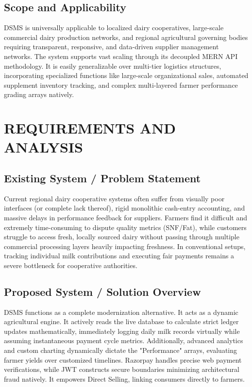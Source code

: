 \documentclass[12pt,a4paper]{report}
\begin{document}
\section{Scope and Applicability}
DSMS is universally applicable to localized dairy cooperatives, large-scale commercial dairy production networks, and regional agricultural governing bodies requiring transparent, responsive, and data-driven supplier management networks. The system supports vast scaling through its decoupled MERN API methodology. It is easily generalizable over multi-tier logistics structures, incorporating specialized functions like large-scale organizational sales, automated supplement inventory tracking, and complex multi-layered farmer performance grading arrays natively.

\chapter{REQUIREMENTS AND ANALYSIS}
\section{Existing System / Problem Statement}
Current regional dairy cooperative systems often suffer from visually poor interfaces (or complete lack thereof), rigid monolithic cash-entry accounting, and massive delays in performance feedback for suppliers. Farmers find it difficult and extremely time-consuming to dispute quality metrics (SNF/Fat), while customers struggle to access fresh, locally sourced dairy without passing through multiple commercial processing layers heavily impacting freshness. In conventional setups, tracking individual milk contributions and executing fair payments remains a severe bottleneck for cooperative authorities.

\section{Proposed System / Solution Overview}
DSMS functions as a complete modernization alternative. It acts as a dynamic agricultural engine. It actively reads the live database to calculate strict ledger updates mathematically, immediately logging daily milk records virtually while assuming instantaneous payment cycle metrics. Additionally, advanced analytics and custom charting dynamically dictate the "Performance" arrays, evaluating farmer yields over customized timelines. Razorpay handles precise web payment verifications, while JWT constructs secure boundaries minimizing architectural fraud natively. It empowers Direct Selling, linking consumers directly to farmers.
\end{document}
